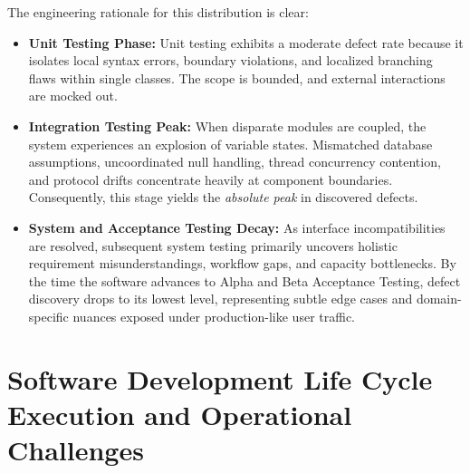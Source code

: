 \documentclass[11pt,a4paper]{article}
\begin{document}
The engineering rationale for this distribution is clear:
\begin{itemize}
    \item \textbf{Unit Testing Phase:} Unit testing exhibits a moderate defect rate because it isolates local syntax errors, boundary violations, and localized branching flaws within single classes. The scope is bounded, and external interactions are mocked out.
    \item \textbf{Integration Testing Peak:} When disparate modules are coupled, the system experiences an explosion of variable states. Mismatched database assumptions, uncoordinated null handling, thread concurrency contention, and protocol drifts concentrate heavily at component boundaries. Consequently, this stage yields the \textit{absolute peak} in discovered defects.
    \item \textbf{System and Acceptance Testing Decay:} As interface incompatibilities are resolved, subsequent system testing primarily uncovers holistic requirement misunderstandings, workflow gaps, and capacity bottlenecks. By the time the software advances to Alpha and Beta Acceptance Testing, defect discovery drops to its lowest level, representing subtle edge cases and domain-specific nuances exposed under production-like user traffic.
\end{itemize}

\section{Software Development Life Cycle Execution and Operational Challenges}
\label{sec:sdlc_execution}
\end{document}

